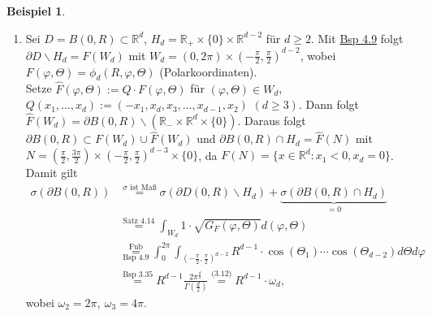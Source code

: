 \documentclass[a4paper]{report}
\newcommand{\R}{\mathbb{R}}
\newcommand{\overunderset}[3]{\overset{#1}{\underset{#3}{#2}}}
\newcommand{\jlabel}[1]{\label{j_#1}}
\newcommand{\jshortlink}[1]{\jhyperref{#1}{\text{#1}}}
\newcommand{\jhyperref}[2]{\hyperref[j_#1]{#2}}
\newcommand{\jlink}[1]{\jhyperref{#1}{#1}}
\newcommand{\jshortlinkFubini}{\jhyperref{Fubini}{\text{Fub}}}
\theoremstyle{plain}
\theoremstyle{definition}
\newtheorem{expl}[thm]{Beispiel}
\begin{document}
{{{{\jlabel{Bsp 4.15}
\begin{expl}
    \begin{enumerate}
        \item
            \jlabel{Bsp 4.15a)}
            Sei $D=B(0,R) \subset \R^d$, $H_d = \R_+ \times \{0\} \times \R^{d-2}$ für $d\ge 2$. Mit \jlink{Bsp 4.9} folgt $\partial D\backslash H_d = F(W_d)$ mit $W_d = (0,2\pi)\times (-\frac{\pi}{2}, \frac{\pi}{2})^{d-2}$, wobei $F(\varphi, \Theta) = \phi_d(R,\varphi, \Theta)$ (Polarkoordinaten).\\
            Setze $\hat{F}(\varphi,\Theta) := Q\cdot F(\varphi,\Theta)$ für $(\varphi,\Theta) \in W_d$,\\ $Q(x_1,\dots,x_d) := (-x_1,x_d,x_3,\dots,x_{d-1},x_2)$ $(d\ge 3)$. Dann folgt $\hat{F}(W_d) = \partial B(0,R) \backslash (\R_-\times \R^d\times \{0\})$. Daraus folgt $\partial B(0,R) \subset F(W_d) \cup \hat{F}(W_d)$ und $\partial B(0,R)\cap H_d = \hat{F}(N)$ mit $N = \left(\frac{\pi}{2}, \frac{3\pi}{2} \right) \times \left(-\frac{\pi}{2},\frac{\pi}{2}  \right)^{d-3} \times \{0\}$, da $F(N) = \{x\in\R^d : x_1 < 0, x_d = 0\}$. Damit gilt
            \[
                \begin{split}
                    \sigma(\partial B(0,R)) &\overset{\sigma \text{ ist Maß}}{=} \sigma(\partial D(0,R)\backslash H_d) + \underbrace{\sigma(\partial B(0,R)\cap H_d)}_{=0}\\
                    &\overset{\jshortlink{Satz 4.14}}{=} \int_{W_d} 1 \cdot \sqrt{G_F(\varphi, \Theta)} d(\varphi, \Theta)\\
                    &\overunderset{\jshortlinkFubini}{=}{\jshortlink{Bsp 4.9}} \int_0^{2\pi} \int_{\left(-\frac{\pi}{2},\frac{\pi}{2} \right)^{d-2}} R^{d-1}\cdot \cos(\Theta_1)\cdots \cos(\Theta_{d-2}) d\Theta d\varphi\\
                    &\overset{\jshortlink{Bsp 3.35}}{=} R^{d-1} \frac{2\pi^\frac{d}{2}}{\Gamma\left(\frac{d}{2}\right)} \overset{\jshortlink{(3.12)}}{=} R^{d-1}\cdot \omega_d,
                 \end{split}
            \]
            wobei $\omega_2 = 2\pi,\ \omega_3 = 4\pi$.
            

\end{enumerate}
\end{expl}}}}}
\end{document}
